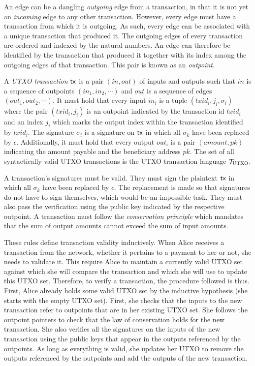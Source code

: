 An edge can be a dangling \emph{outgoing} edge from a transaction, in that it is
not yet an \emph{incoming} edge to any other transaction. However, every edge
must have a transaction from which it is outgoing. As such, every edge can be
associated with a unique transaction that produced it. The outgoing edges of
every transaction are ordered and indexed by the natural numbers. An edge can
therefore be identified by the transaction that produced it together with its
index among the outgoing edges of that transaction. This pair is known as an
\emph{outpoint}.

\begin{definition}
  A \emph{UTXO transaction} $\mathsf{tx}$ is a pair $(in, out)$ of inputs and outputs such
  that $in$ is a sequence of outpoints $(in_1, in_2, \cdots)$ and $out$ is a
  sequence of edges $(out_1, out_2, \cdots)$. It must hold that every input
  $in_i$ is a tuple $(txid_i, j_i, \sigma_i)$ where the pair $(txid_i, j_i)$ is
  an outpoint indicated by the transaction id $txid_i$ and an index $j_i$
  which marks the output index within the transaction
  identified by $txid_i$. The signature $\sigma_i$ is a signature on $\mathsf{tx}$
  in which all $\sigma_k$ have been replaced by $\epsilon$. Additionally, it
  must hold that every output $out_i$ is a pair $(amount, pk)$ indicating the
  amount payable and the beneficiary address $pk$. The set of all syntactically
  valid UTXO transactions is the UTXO transaction language
  $\mathcal{T}_{\textsc{UTXO}}$.
\end{definition}

A transaction's signatures must be valid. They must sign the plaintext $\mathsf{tx}$ in
which all $\sigma_k$ have been replaced by $\epsilon$. The replacement is made
so that signatures do not have to sign themselves, which would be an impossible
task. They must also pass the verification using the public key indicated by the
respective outpoint. A transaction must follow the \emph{conservation
principle} which mandates that the sum of output
amounts cannot exceed the sum of input amounts.

These rules define transaction validity inductively. When Alice receives a
transaction from the network, whether it pertains to a payment to her or not,
she needs to validate it. This require Alice to maintain a currently valid UTXO
set against which she will compare the transaction and which she will use to
update this UTXO set. Therefore, to verify a transaction, the procedure followed
is thus. First, Alice already holds some valid UTXO set by the inductive
hypothesis (she starts with the empty UTXO set). First, she checks that the
inputs to the new transaction refer to outpoints that are in her existing UTXO
set. She follows the outpoint pointers to check that the law of conservation
holds for the new transaction. She also verifies all the signatures on the
inputs of the new transaction using the public keys that appear in the
outputs referenced by the outpoints. As long as everything is valid, she updates
her UTXO to remove the outputs referenced by the outpoints and add the outputs
of the new transaction.

